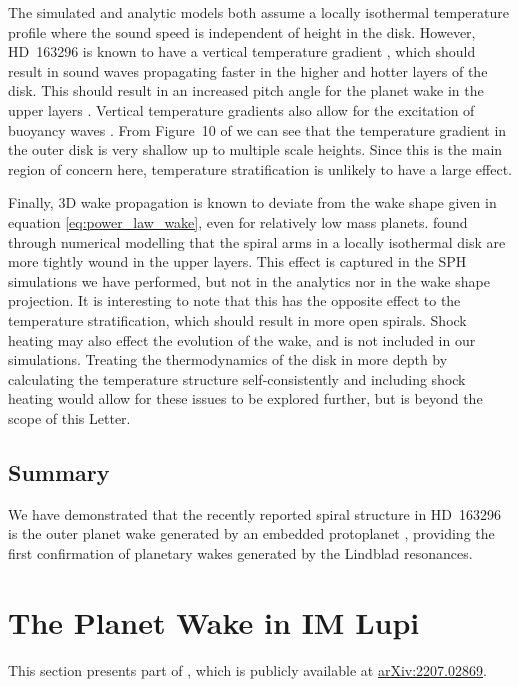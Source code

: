 The simulated and analytic models both assume a locally isothermal temperature profile where the sound speed is independent of height in the disk.
However, HD~163296 is known to have a vertical temperature gradient \citep{rosenfeld2013,degregorio-monsalvo2013}, which should result in sound waves propagating faster in the higher and hotter layers of the disk.
This should result in an increased pitch angle for the planet wake in the upper layers \citep{juhasz2018}.
Vertical temperature gradients also allow for the excitation of buoyancy waves \citep{bae2021}.
From Figure~10 of \citet{law2021} we can see that the temperature gradient in the outer disk is very shallow up to multiple scale heights. 
Since this is the main region of concern here, temperature stratification is unlikely to have a large effect.

Finally, 3D wake propagation is known to deviate from the wake shape given in equation \ref{eq:power_law_wake}, even for relatively low mass planets.
\citet{zhu2015} found through numerical modelling that the spiral arms in a locally isothermal disk are more tightly wound in the upper layers.
This effect is captured in the SPH simulations we have performed, but not in the analytics nor in the wake shape projection.
It is interesting to note that this has the opposite effect to the temperature stratification, which should result in more open spirals.
Shock heating may also effect the evolution of the wake, and is not included in our simulations.
Treating the thermodynamics of the disk in more depth by calculating the temperature structure self-consistently and including shock heating would allow for these issues to be explored further, but is beyond the scope of this Letter.

\subsection{Summary}

We have demonstrated that the recently reported spiral structure in HD~163296 \citep{teague2021} is the outer planet wake generated by an embedded protoplanet \citep{pinte2018a}, providing the first confirmation of planetary wakes generated by the Lindblad resonances.

\section{The Planet Wake in IM Lupi} \label{sec:IMLupiwake}

This section presents part of \citet{verrios2022}, which is publicly available at \href{https://arxiv.org/abs/2207.02869}{\url{arXiv:2207.02869}}.

